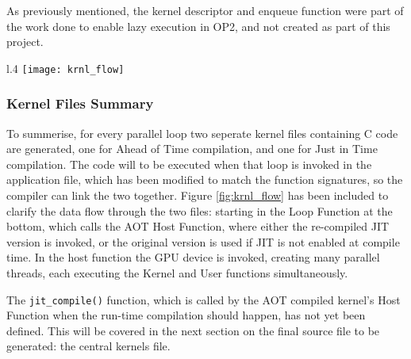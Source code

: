 As previously mentioned, the kernel descriptor and enqueue function were part of the work done to enable lazy execution in OP2, and not created as part of this project.

\clearpage

\begin{wrapfigure}[13]{l}{.4\textwidth}
  \centering
  \texttt{[image: krnl\_flow]}
  \caption{Kernel Flow}
  \label{fig:krnl_flow}
\end{wrapfigure}

\subsubsection{Kernel Files Summary}
\label{impl_summary}

To summerise, for every parallel loop two seperate kernel files containing C code are generated, one for Ahead of Time compilation, and one for Just in Time compilation. The code will to be executed when that loop is invoked in the application file, which has been modified to match the function signatures, so the compiler can link the two together. Figure \ref{fig:krnl_flow} has been included to clarify the data flow through the two files: starting in the Loop Function at the bottom, which calls the AOT Host Function, where either the re-compiled JIT version is invoked, or the original version is used if JIT is not enabled at compile time. In the host function the GPU device is invoked, creating many parallel threads, each executing the Kernel and User functions simultaneously.

The \verb|jit_compile()| function, which is called by the AOT compiled kernel's Host Function when the run-time compilation should happen, has not yet been defined. This will be covered in the next section on the final source file to be generated: the central kernels file.
\clearpage
